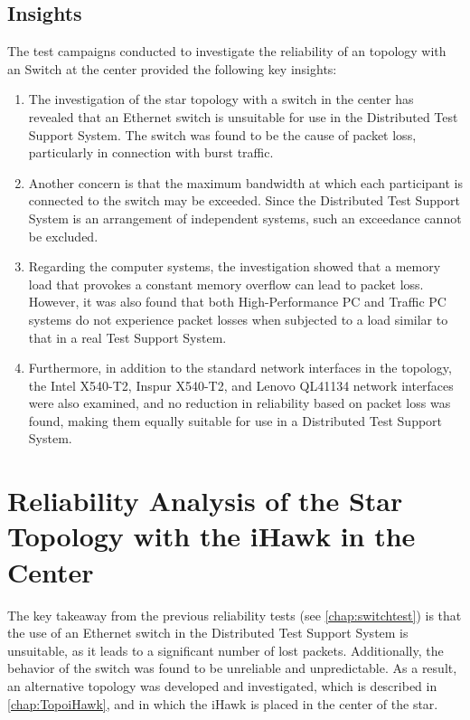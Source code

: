 \subsection{Insights} \label{insight:Switch}
The test campaigns conducted to investigate the reliability of an topology with an Switch at the center provided the following key insights:

\begin{enumerate}[label=(\roman*)]
    \item The investigation of the star topology with a switch in the center has revealed that an Ethernet switch is unsuitable for use in the Distributed Test Support System. The switch was found to be the cause of packet loss, particularly in connection with burst traffic. \label{insight:Switch:1}
    \item Another concern is that the maximum bandwidth at which each participant is connected to the switch may be exceeded. Since the Distributed Test Support System is an arrangement of independent systems, such an exceedance cannot be excluded. \label{insight:Switch:1}
    \item Regarding the computer systems, the investigation showed that a memory load that provokes a constant memory overflow can lead to packet loss. However, it was also found that both High-Performance PC and Traffic PC systems do not experience packet losses when subjected to a load similar to that in a real Test Support System. \label{insight:Switch:1}
    \item Furthermore, in addition to the standard network interfaces in the topology, the Intel X540-T2, Inspur X540-T2, and Lenovo QL41134 network interfaces were also examined, and no reduction in reliability based on packet loss was found, making them equally suitable for use in a Distributed Test Support System. \label{insight:Switch:1}
\end{enumerate}



\clearpage
\section{Reliability Analysis of the Star Topology with the iHawk in the Center} \label{chap:ReliabIhawk}

The key takeaway from the previous reliability tests (see \ref{chap:switchtest}) is that the use of an Ethernet switch in the Distributed Test Support System is unsuitable, as it leads to a significant number of lost packets. Additionally, the behavior of the switch was found to be unreliable and unpredictable. As a result, an alternative topology was developed and investigated, which is described in \ref{chap:TopoiHawk}, and in which the iHawk is placed in the center of the star.


